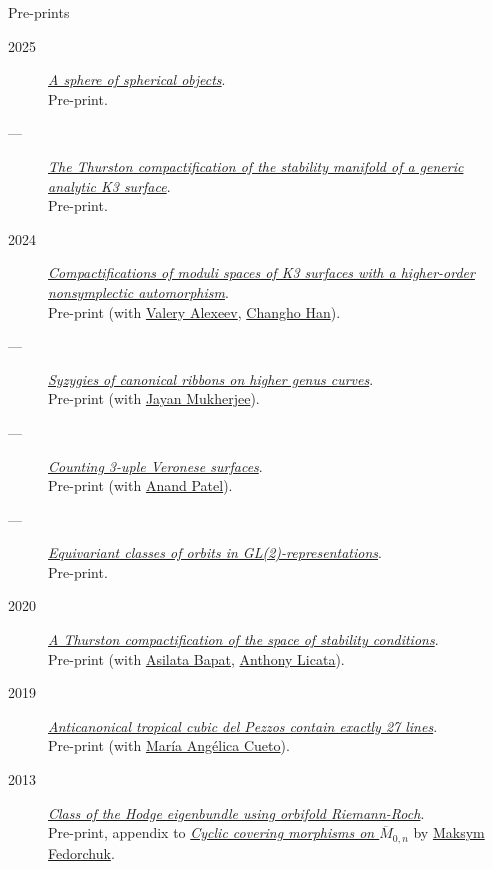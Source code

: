 \documentclass[11pt]{article}
\begin{document}
\begin{description}
\item[{Pre-prints}] 
\end{description}
\label{org8710327}
\begin{description}
\item[{2025}] \emph{\href{papers/spherical-sphere.pdf}{A sphere of spherical objects}}.\\
Pre-print.
\item[{---}] \emph{\href{papers/CompStabGenK3.pdf}{The Thurston compactification of the stability manifold of a generic analytic K3 surface}}.\\
Pre-print.
\item[{2024}] \emph{\href{papers/k3z3.pdf}{Compactifications of moduli spaces of K3 surfaces with a higher-order nonsymplectic automorphism}}.\\
Pre-print (with \href{https://www.math.uga.edu/directory/people/valery-alexeev}{Valery Alexeev}, \href{https://sites.google.com/view/changho-han/}{Changho Han}).
\item[{---}] \emph{\href{papers/highergenusribbons.pdf}{Syzygies of canonical ribbons on higher genus curves}}.\\
Pre-print (with \href{https://sites.google.com/view/mukherjeejayan}{Jayan Mukherjee}).
\item[{---}] \emph{\href{papers/3veroneseP2.pdf}{Counting 3-uple Veronese surfaces}}.\\
Pre-print (with \href{https://sites.google.com/view/anand-patel}{Anand Patel}).
\item[{---}] \emph{\href{papers/gl2orbits.pdf}{Equivariant classes of orbits in GL(2)-representations}}.\\
Pre-print.
\item[{2020}] \emph{\href{papers/a2-compactification.pdf}{A Thurston compactification of the space of stability conditions}}.\\
Pre-print (with \href{https://asilata.org/}{Asilata Bapat}, \href{https://maths-people.anu.edu.au/\~licatat/}{Anthony Licata}).
\item[{2019}] \emph{\href{papers/lines\_on\_tropical\_cubics.pdf}{Anticanonical tropical cubic del Pezzos contain exactly 27 lines}}.\\
Pre-print (with \href{https://people.math.osu.edu/cueto.5/}{María Angélica Cueto}).
\item[{2013}] \emph{\href{papers/CyclicAppendix.pdf}{Class of the Hodge eigenbundle using orbifold Riemann-Roch}}.\\
Pre-print, appendix to \href{https://drive.google.com/file/d/1wq-Fh3DiqODc51t-J0phIexVF7B4lxsY/view}{\emph{Cyclic covering morphisms on \(\overline M_{0,n}\)}} by \href{https://www2.bc.edu/maksym-fedorchuk/}{Maksym Fedorchuk}.
\end{description}
\end{document}
